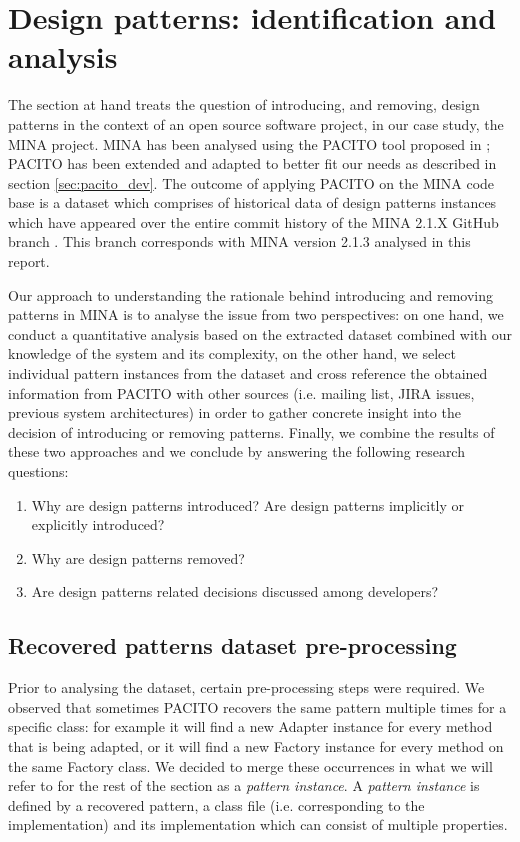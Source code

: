 \section{Design patterns: identification and analysis}
\label{sec:pattern_analysis}

\localtableofcontents
\newpage

The section at hand treats the question of introducing, and removing, design patterns in the context of an open source software project, in our case study, the MINA project. MINA has been analysed using the PACITO tool proposed in \cite{pacito}; PACITO has been extended and adapted to better fit our needs as described in section \ref{sec:pacito_dev}. The outcome of applying PACITO on the MINA code base is a dataset which comprises of historical data of design patterns instances which have appeared over the entire commit history of the MINA 2.1.X GitHub branch \cite{mina-github}. This branch corresponds with MINA version 2.1.3 analysed in this report.

Our approach to understanding the rationale behind introducing and removing patterns in MINA is to analyse the issue from two perspectives: on one hand, we conduct a quantitative analysis based on the extracted dataset combined with our knowledge of the system and its complexity, on the other hand, we select individual pattern instances from the dataset and cross reference the obtained information from PACITO with other sources (i.e. mailing list, JIRA issues, previous system architectures) in order to gather concrete insight into the decision of introducing or removing patterns. Finally, we combine the results of these two approaches and we conclude by answering the following research questions:
\begin{enumerate}
    \item Why are design patterns introduced? Are design patterns implicitly or explicitly introduced?
    \item Why are design patterns removed?
    \item Are design patterns related decisions discussed among developers?
\end{enumerate}

\subsection{Recovered patterns dataset pre-processing}
Prior to analysing the dataset, certain pre-processing steps were required. We observed that sometimes PACITO recovers the same pattern multiple times for a specific class: for example it will find a new Adapter instance for every method that is being adapted, or it will find a new Factory instance for every method on the same Factory class. We decided to merge these occurrences in what we will refer to for the rest of the section as a \textit{pattern instance}. A \textit{pattern instance} is defined by a recovered pattern, a class file (i.e. corresponding to the implementation) and its implementation which can consist of multiple properties.

